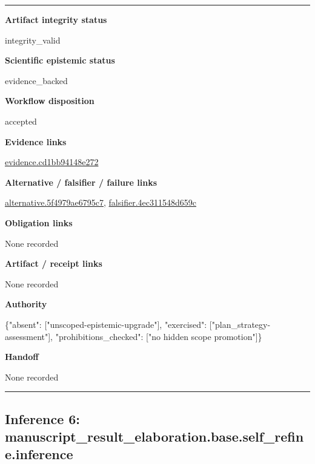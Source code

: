 \documentclass[10pt,a4paper]{article}
\newcommand{\TraceField}[2]{\par\noindent\textbf{#1}\par\noindent #2\par\smallskip}
\newenvironment{TraceDossier}{\par\medskip\noindent\hrule\medskip}{\medskip\hrule\par\medskip}
\begin{document}
\begin{TraceDossier}
\TraceField{Artifact integrity status}{integrity\_\allowbreak{}valid}

\TraceField{Scientific epistemic status}{evidence\_\allowbreak{}backed}

\TraceField{Workflow disposition}{accepted}

\TraceField{Evidence links}{\hyperlink{trace-evidence-e3e5f9c227c4173927}{evidence.\allowbreak{}cd1bb94148\allowbreak{}e272}}

\TraceField{Alternative / falsifier / failure links}{\hyperlink{trace-alternative-6087cd6e153c61552d}{alternativ\allowbreak{}e.\allowbreak{}5f4979ae67\allowbreak{}95c7}, \hyperlink{trace-alternative-a18d295ff9e72de308}{falsifier.\allowbreak{}4ec311548d\allowbreak{}659c}}

\TraceField{Obligation links}{None recorded}

\TraceField{Artifact / receipt links}{None recorded}

\TraceField{Authority}{\{"absent":\allowbreak{} ["unscoped\allowbreak{}-\allowbreak{}epistemic-\allowbreak{}upgrade"],\allowbreak{} "exercised\allowbreak{}":\allowbreak{} ["plan\_\allowbreak{}strategy-\allowbreak{}assessment\allowbreak{}"], "prohibiti\allowbreak{}ons\_\allowbreak{}checked":\allowbreak{} ["no hidden scope promotion"\allowbreak{}]\}}

\TraceField{Handoff}{None recorded}

\end{TraceDossier}
\pagebreak[2]\subsection{Inference 6: manuscript\allowbreak{}\_\allowbreak{}result\_\allowbreak{}elaboratio\allowbreak{}n.\allowbreak{}base.\allowbreak{}self\_\allowbreak{}refine.\allowbreak{}inference}\label{trace-inference-e5677997fd8926a269}
\end{document}
